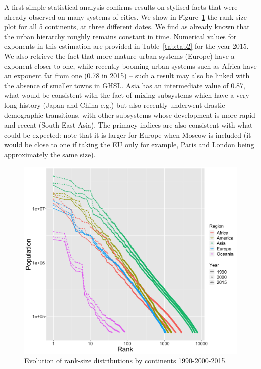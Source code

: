 \documentclass[11pt]{article}
\begin{document}
A first simple statistical analysis confirms results on stylised facts that were already observed on many systems of cities. We show in Figure~\ref{fig:fig1} the rank-size plot for all 5 continents, at three different dates. We find as already known that the urban hierarchy roughly remains constant in time. Numerical values for exponents in this estimation are provided in Table~\ref{tab:tab2} for the year 2015. We also retrieve the fact that more mature urban systems (Europe) have a exponent closer to one, while recently booming urban systems such as Africa have an exponent far from one (0.78 in 2015) – such a result may also be linked with the absence of smaller towns in GHSL. Asia has an intermediate value of 0.87, what would be consistent with the fact of mixing subsystems which have a very long history (Japan and China e.g.) but also recently underwent drastic demographic transitions, with other subsystems whose development is more rapid and recent (South-East Asia). The primacy indices are also consistent with what could be expected: note that it is larger for Europe when Moscow is included (it would be close to one if taking the EU only for example, Paris and London being approximately the same size).

\begin{figure}
\centering
\includegraphics[width=\textwidth]{Fig1.png}
\caption{Evolution of rank-size distributions by continents 1990-2000-2015.\label{fig:fig1}}
\end{figure}   
\end{document}
